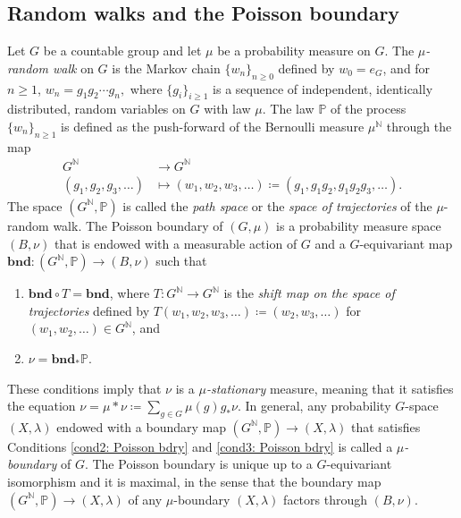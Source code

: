 \documentclass[reqno,oneside,11pt]{amsart}
\renewcommand{\P}{\mathbb{P}}
\theoremstyle{plain}
\theoremstyle{definition}
\begin{document}
\subsection{Random walks and the Poisson boundary}\label{subsection: rw and poisson boundary}
Let $G$ be a countable group and let $\mu$ be a probability measure on $G$. The \emph{$\mu$-random walk} on $G$ is the Markov chain $\{w_n\}_{n\ge 0}$ defined by $w_0=e_G$, and for $n\ge 1$, $w_n=g_1g_2\cdots g_n,$ where $\{g_i\}_{i\ge 1}$ is a sequence of independent, identically distributed, random variables on $G$ with law $\mu$. The law $\P$ of the process $\{w_n\}_{n\ge 1}$ is defined as the push-forward of the Bernoulli measure $\mu^{\mathbb{N}}$ through the map
\begin{equation*}
	\begin{aligned}
		G^{\mathbb{N}}&\to G^{\mathbb{N}}\\
		(g_1,g_2,g_3,\ldots)&\mapsto (w_1,w_2,w_3,\ldots)\coloneqq (g_1,g_1g_2,g_1g_2g_3,\ldots).
	\end{aligned}
\end{equation*}
The space $(G^{\mathbb{N}},\P)$ is called the \emph{path space} or the \emph{space of trajectories} of the $\mu$-random walk. The Poisson boundary of $(G,\mu)$ is a probability measure space $(B,\nu)$ that is endowed with a measurable action of $G$ and a $G$-equivariant map $\mathbf{bnd}:(G^{\mathbb{N}},\P)\to (B,\nu)$ such that
\begin{enumerate}
	\item\label{cond2: Poisson bdry}  $\mathbf{bnd}\circ T=\mathbf{bnd}$, where $T:G^{\mathbb{N}}\to G^{\mathbb{N}}$ is the \emph{shift map on the space of trajectories} defined by $T(w_1,w_2,w_3,\ldots)\coloneqq (w_2,w_3,\ldots)$ for $(w_1,w_2,\ldots)\in G^{\mathbb{N}}$, and
	\item \label{cond3: Poisson bdry} $\nu=\mathbf{bnd}_{*}\P$.
\end{enumerate} These conditions imply that $\nu$ is a \emph{$\mu$-stationary} measure, meaning that it satisfies the equation $\nu=\mu*\nu\coloneqq\sum_{g\in G}\mu(g)g_{*}\nu$. In general, any probability $G$-space $(X,\lambda)$ endowed with a boundary map $(G^{\mathbb{N}},\P)\to (X,\lambda)$ that satisfies Conditions \eqref{cond2: Poisson bdry} and \eqref{cond3: Poisson bdry} is called a \emph{$\mu$-boundary} of $G$. The Poisson boundary is unique up to a $G$-equivariant isomorphism and it is maximal, in the sense that the boundary map $(G^{\mathbb{N}},\P)\to (X,\lambda)$ of any $\mu$-boundary $(X,\lambda)$ factors through $(B,\nu)$. 
\end{document}
